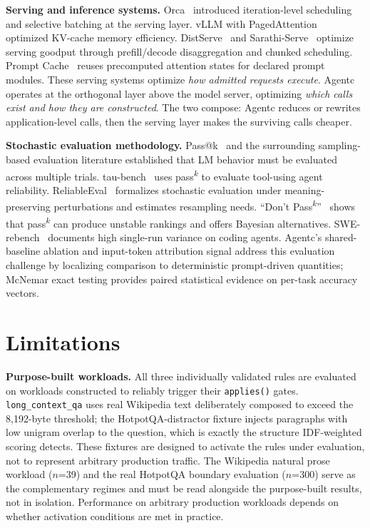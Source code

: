 \documentclass[sigconf,9pt]{acmart}
\begin{document}
\textbf{Serving and inference systems.} Orca~\cite{yu2022orca} introduced
iteration-level scheduling and selective batching at the serving layer. vLLM with
PagedAttention~\cite{kwon2023vllm} optimized KV-cache memory efficiency.
DistServe~\cite{zhong2024distserve} and Sarathi-Serve~\cite{agrawal2024sarathiserve}
optimize serving goodput through prefill/decode disaggregation and chunked scheduling.
Prompt Cache~\cite{gim2024promptcache} reuses precomputed attention states for
declared prompt modules. These serving systems optimize \emph{how admitted requests
execute}. Agentc operates at the orthogonal layer above the model server, optimizing
\emph{which calls exist and how they are constructed}. The two compose: Agentc reduces
or rewrites application-level calls, then the serving layer makes the surviving calls
cheaper.

\textbf{Stochastic evaluation methodology.} Pass@k~\cite{chen2021humaneval} and the
surrounding sampling-based evaluation literature established that LM behavior must be
evaluated across multiple trials. tau-bench~\cite{yao2025taubench} uses
pass\textsuperscript{$k$} to evaluate tool-using agent reliability.
ReliableEval~\cite{lior2025reliableeval} formalizes stochastic evaluation under
meaning-preserving perturbations and estimates resampling needs. ``Don't
Pass\textsuperscript{$k$}''~\cite{hariri2026passk} shows that
pass\textsuperscript{$k$} can produce unstable rankings and offers Bayesian
alternatives. SWE-rebench~\cite{badertdinov2025swerebench} documents high single-run
variance on coding agents. Agentc's shared-baseline ablation and input-token
attribution signal address this evaluation challenge by localizing comparison to
deterministic prompt-driven quantities; McNemar exact testing provides paired
statistical evidence on per-task accuracy vectors.

\section{Limitations}
\label{sec:limitations}

\textbf{Purpose-built workloads.} All three individually validated rules are evaluated
on workloads constructed to reliably trigger their \texttt{applies()} gates.
\texttt{long\_context\_qa} uses real Wikipedia text deliberately composed to exceed
the 8,192-byte threshold; the HotpotQA-distractor fixture injects paragraphs with
low unigram overlap to the question, which is exactly the structure IDF-weighted
scoring detects. These fixtures are designed to activate the rules under evaluation,
not to represent arbitrary production traffic. The Wikipedia natural prose workload
($n$=39) and the real HotpotQA boundary evaluation ($n$=300) serve as the
complementary regimes and must be read alongside the purpose-built results, not in
isolation. Performance on arbitrary production workloads depends on whether
activation conditions are met in practice.
\end{document}
